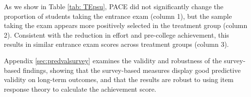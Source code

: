 


As we show in Table \ref{tab: TEpsu}, PACE did not significantly change the proportion of students taking the entrance exam (column 1), but the sample taking the exam appears more positively selected in the treatment group (column 2). Consistent with the reduction in effort and pre-college achievement, this results in similar entrance exam scores across treatment groups (column 3).\par 


Appendix \ref{sec:predvalsurvey} examines the validity and robustness of the survey-based findings, showing that the survey-based measures display good predictive validity on long-term outcomes, and that the results are robust to using item response theory to calculate the achievement score.

